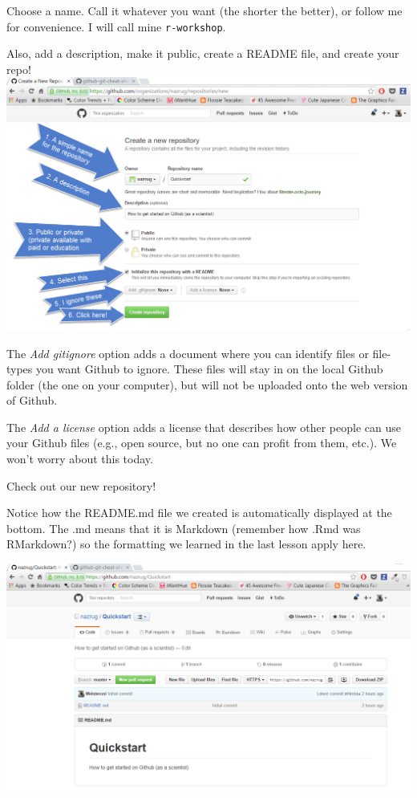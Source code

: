 \documentclass[]{book}
\begin{document}
Choose a name. Call it whatever you want (the shorter the better), or follow me for convenience. I will call mine \texttt{r-workshop}.

Also, add a description, make it public, create a README file, and create your repo!
\includegraphics{img/create_repository_2.png}

The \emph{Add gitignore} option adds a document where you can identify files or file-types you want Github to ignore. These files will stay in on the local Github folder (the one on your computer), but will not be uploaded onto the web version of Github.

The \emph{Add a license} option adds a license that describes how other people can use your Github files (e.g., open source, but no one can profit from them, etc.). We won't worry about this today.

Check out our new repository!

Notice how the README.md file we created is automatically displayed at the bottom. The .md means that it is Markdown (remember how .Rmd was RMarkdown?) so the formatting we learned in the last lesson apply here.

\includegraphics{img/new_repository.png}
\end{document}
